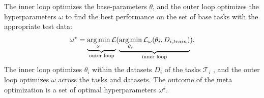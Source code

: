 The inner loop optimizes the base-parameters $\theta$, and the outer loop
optimizes the hyperparameters $\omega$ to find the best performance on
the set of base tasks %
with the appropriate test data:
$$ \omega^\star=\underbrace{\operatorname*{arg\,min}_\omega
  \mathcal{L}}_{\textrm{outer loop}} (\underbrace{\operatorname*{arg\,min}_{\theta_i}
\mathcal{L}_\omega (\theta_i,D_{i,train})}_{\textrm{inner loop}}) .$$
The inner loop optimizes $\theta_i$ within the datasets $D_i$ of the
tasks $\mathcal{T}_i$ , and the
outer loop optimizes $\omega$ across the tasks and datasets.
The outcome of the meta
optimization is a set of optimal hyperparameters $\omega^\star$.

